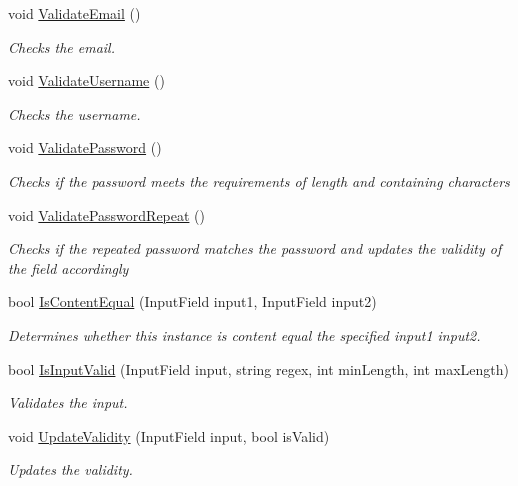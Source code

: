 \begin{DoxyCompactItemize}
void \hyperlink{classRegisterController_af4daa10f24e177e3dc114128ef2aedbe}{Validate\+Email} ()
\begin{DoxyCompactList}\small\item\em Checks the email. \end{DoxyCompactList}\item 
void \hyperlink{classRegisterController_ab1addfaffc04ea9065b81724d4f7e8cb}{Validate\+Username} ()
\begin{DoxyCompactList}\small\item\em Checks the username. \end{DoxyCompactList}\item 
void \hyperlink{classRegisterController_a6ec9cefdd115c96a4619df4b4154b10b}{Validate\+Password} ()
\begin{DoxyCompactList}\small\item\em Checks if the password meets the requirements of length and containing characters \end{DoxyCompactList}\item 
void \hyperlink{classRegisterController_a0cb0ad305504222292c52f22f558822e}{Validate\+Password\+Repeat} ()
\begin{DoxyCompactList}\small\item\em Checks if the repeated password matches the password and updates the validity of the field accordingly \end{DoxyCompactList}\item 
bool \hyperlink{classRegisterController_a7728cb73673b72b2fa059200a9cbc4af}{Is\+Content\+Equal} (Input\+Field input1, Input\+Field input2)
\begin{DoxyCompactList}\small\item\em Determines whether this instance is content equal the specified input1 input2. \end{DoxyCompactList}\item 
bool \hyperlink{classRegisterController_a962585ca46ff0707c3ca32d5300c5716}{Is\+Input\+Valid} (Input\+Field input, string regex, int min\+Length, int max\+Length)
\begin{DoxyCompactList}\small\item\em Validates the input. \end{DoxyCompactList}\item 
void \hyperlink{classRegisterController_a02902491d57c7eb064bbcec47b4ff1a1}{Update\+Validity} (Input\+Field input, bool is\+Valid)
\begin{DoxyCompactList}\small\item\em Updates the validity. \end{DoxyCompactList}\item 

\end{DoxyCompactItemize}
